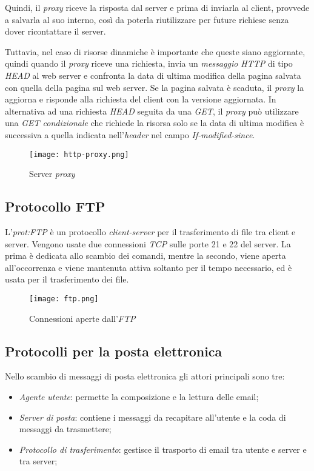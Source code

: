Quindi, il \emph{proxy} riceve la risposta dal server e prima di inviarla al
client, provvede a salvarla al suo interno, così da poterla riutilizzare per future
richiese senza dover ricontattare il server.

Tuttavia, nel caso di risorse dinamiche è importante che queste siano aggiornate,
quindi quando il \emph{proxy} riceve una richiesta, invia un \emph{messaggio HTTP}
di tipo \emph{HEAD} al web server e confronta la data di ultima modifica della
pagina salvata con quella della pagina sul web server. Se la pagina salvata è
scaduta, il \emph{proxy} la aggiorna e risponde alla richiesta del client
con la versione aggiornata. In alternativa ad una richiesta \emph{HEAD} seguita
da una \emph{GET}, il \emph{proxy} può utilizzare una \emph{GET condizionale} che
richiede la risorsa solo se la data di ultima modifica è successiva a quella
indicata nell'\emph{header} nel campo \emph{If-modified-since}.

\begin{figure}[h]
    \centering
    \texttt{[image: http-proxy.png]}
    \caption{Server \emph{proxy}}
\end{figure}

\subsection{Protocollo FTP}
L'\emph{\gls{prot:FTP}} è un protocollo \emph{client-server} per il trasferimento
di file tra client e server. Vengono usate due connessioni \emph{TCP} sulle
porte 21 e 22 del server. La prima è dedicata allo scambio dei comandi, mentre la
secondo, viene aperta all'occorrenza e viene mantenuta attiva soltanto per il
tempo necessario, ed è usata per il trasferimento dei file.

\begin{figure}[ht]
    \centering
    \texttt{[image: ftp.png]}
    \caption{Connessioni aperte dall'\emph{FTP}}
\end{figure}

\newpage
\subsection{Protocolli per la posta elettronica}
Nello scambio di messaggi di posta elettronica gli attori principali sono tre:
\begin{itemize}
    \item \emph{Agente utente}: permette la composizione e la lettura delle email;
    \item \emph{Server di posta}: contiene i messaggi da recapitare all'utente e la
    coda di messaggi da trasmettere;
    \item \emph{Protocollo di trasferimento}: gestisce il trasporto di email tra
    utente e server e tra server;
\end{itemize}

